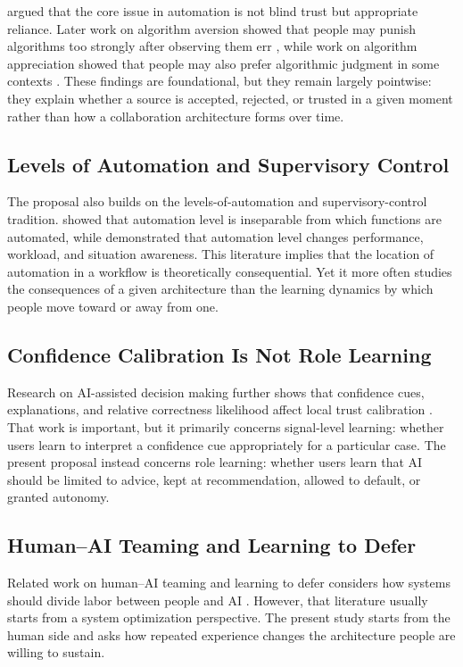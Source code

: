 \documentclass[man,natbib]{apa7}
\begin{document}
\citet{lee2004trust} argued that the core issue in automation is not blind trust but appropriate reliance. Later work on algorithm aversion showed that people may punish algorithms too strongly after observing them err \citep{dietvorst2015algorithm}, while work on algorithm appreciation showed that people may also prefer algorithmic judgment in some contexts \citep{logg2019algorithm}. These findings are foundational, but they remain largely pointwise: they explain whether a source is accepted, rejected, or trusted in a given moment rather than how a collaboration architecture forms over time.

\subsection{Levels of Automation and Supervisory Control}

The proposal also builds on the levels-of-automation and supervisory-control tradition. \citet{parasuraman2000levels} showed that automation level is inseparable from which functions are automated, while \citet{endsley1999automation} demonstrated that automation level changes performance, workload, and situation awareness. This literature implies that the location of automation in a workflow is theoretically consequential. Yet it more often studies the consequences of a given architecture than the learning dynamics by which people move toward or away from one.

\subsection{Confidence Calibration Is Not Role Learning}

Research on AI-assisted decision making further shows that confidence cues, explanations, and relative correctness likelihood affect local trust calibration \citep{zhang2020confidence,ma2023trust}. That work is important, but it primarily concerns signal-level learning: whether users learn to interpret a confidence cue appropriately for a particular case. The present proposal instead concerns role learning: whether users learn that AI should be limited to advice, kept at recommendation, allowed to default, or granted autonomy.

\subsection{Human--AI Teaming and Learning to Defer}

Related work on human--AI teaming and learning to defer considers how systems should divide labor between people and AI \citep{mozannar2020defer,bansal2019updates,vaccaro2024combinations}. However, that literature usually starts from a system optimization perspective. The present study starts from the human side and asks how repeated experience changes the architecture people are willing to sustain.
\end{document}
